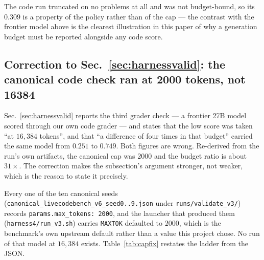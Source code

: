 The code run truncated on no problems at all and was not budget-bound, so its $0.309$ is a
property of the policy rather than of the cap --- the contrast with the frontier model above is
the clearest illustration in this paper of why a generation budget must be reported alongside
any code score.


\subsection{Correction to Sec.~\ref{sec:harnessvalid}: the canonical code check ran at 2000
tokens, not 16384}
\label{sec:harnessvalidfix}

Sec.~\ref{sec:harnessvalid} reports the third grader check --- a frontier 27B model scored
through our own code grader --- and states that the low score was taken ``at $16{,}384$
tokens'', and that ``a difference of four times in that budget'' carried the same model from
$0.251$ to $0.749$. Both figures are wrong. Re-derived from the run's own artifacts, the
canonical cap was $2000$ and the budget ratio is about $31\times$. The correction makes the
subsection's argument stronger, not weaker, which is the reason to state it precisely.

Every one of the ten canonical seeds
(\texttt{canonical\_livecodebench\_v6\_seed0..9.json} under \texttt{runs/validate\_v3/}) records
\texttt{params.max\_tokens: 2000}, and the launcher that produced them
(\texttt{harness4/run\_v3.sh}) carries \texttt{MAXTOK} defaulted to $2000$, which is the
benchmark's own upstream default rather than a value this project chose. No run of that model
at $16{,}384$ exists. Table~\ref{tab:capfix} restates the ladder from the JSON.

